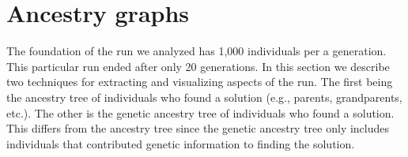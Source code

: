 




\section{Ancestry graphs}
\label{sec:ancestryGraphs}

The foundation of the run we analyzed has 1,000 individuals per a generation. This particular run
ended after only 20 generations. In this section we describe two techniques for extracting and 
visualizing aspects of the run. The first being the ancestry tree of individuals who found a solution 
(e.g., parents, grandparents, etc.). The other is the genetic ancestry tree of individuals who found 
a solution. This differs from the ancestry tree since the genetic ancestry tree only includes 
individuals that contributed genetic information to finding the solution.

